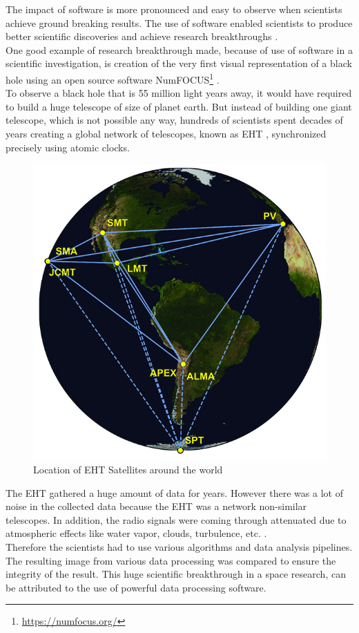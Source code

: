 The impact of software is more pronounced and easy to observe when scientists achieve ground breaking results. The use of software enabled scientists to produce better scientific discoveries and achieve research breakthroughs \citep{goble2014better}. \\

One good example of research breakthrough made, because of use of software in a scientific investigation,  is creation of the very first visual representation of a black hole using an open source software  NumFOCUS\footnote{\url{https://numfocus.org/}} \citep{event2019first}. \\

To observe a black hole that is 55 million light years away, it would have required to build a huge telescope of size of planet earth. But instead of building one giant telescope, which is not possible any way, hundreds of scientists spent decades of years creating a global network of telescopes, known as  \ac{EHT} \citep{event2019first,doeleman2009imaging}, synchronized precisely using atomic clocks.   \\

\begin{figure}[htbp]
	\centering
	\includegraphics[width=.45\textwidth]{4.graphics/figures/ch_2/EHT}
	\caption{Location of \ac{EHT} Satellites around the world \citep{event2019first}}
	\label{fig:chapter03:setup}
\end{figure}

The EHT gathered a huge amount of data for years. However there was a lot of noise in the collected data because the EHT was a network  non-similar telescopes. In addition, the radio signals were coming through attenuated due to atmospheric effects like water vapor, clouds, turbulence, etc. \citep{NumFOCUSblackhole}.\\

Therefore the scientists had to use various algorithms and data analysis pipelines. The resulting image from various data processing was compared to ensure the integrity of the result. This huge scientific breakthrough in a space research, can be attributed to the use of powerful data processing software. 







